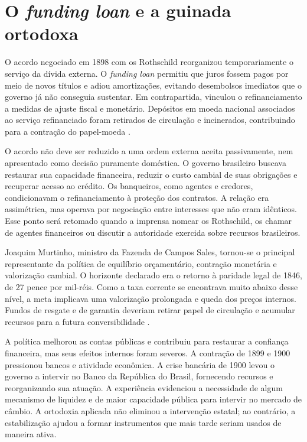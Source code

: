 \section{O \textit{funding loan} e a guinada ortodoxa}

O acordo negociado em 1898 com os Rothschild reorganizou temporariamente o serviço da dívida externa. O \textit{funding loan} permitiu que juros fossem pagos por meio de novos títulos e adiou amortizações, evitando desembolsos imediatos que o governo já não conseguia sustentar. Em contrapartida, vinculou o refinanciamento a medidas de ajuste fiscal e monetário. Depósitos em moeda nacional associados ao serviço refinanciado foram retirados de circulação e incinerados, contribuindo para a contração do papel-moeda \cite{fritsch1980,fritsch1990,francolago2011}.

O acordo não deve ser reduzido a uma ordem externa aceita passivamente, nem apresentado como decisão puramente doméstica. O governo brasileiro buscava restaurar sua capacidade financeira, reduzir o custo cambial de suas obrigações e recuperar acesso ao crédito. Os banqueiros, como agentes e credores, condicionavam o refinanciamento à proteção dos contratos. A relação era assimétrica, mas operava por negociação entre interesses que não eram idênticos. Esse ponto será retomado quando a imprensa nomear os Rothschild, os chamar de agentes financeiros ou discutir a autoridade exercida sobre recursos brasileiros.

Joaquim Murtinho, ministro da Fazenda de Campos Sales, tornou-se o principal representante da política de equilíbrio orçamentário, contração monetária e valorização cambial. O horizonte declarado era o retorno à paridade legal de 1846, de 27 pence por mil-réis. Como a taxa corrente se encontrava muito abaixo desse nível, a meta implicava uma valorização prolongada e queda dos preços internos. Fundos de resgate e de garantia deveriam retirar papel de circulação e acumular recursos para a futura conversibilidade \cite{neuhaus1975,fritsch1980}.

A política melhorou as contas públicas e contribuiu para restaurar a confiança financeira, mas seus efeitos internos foram severos. A contração de 1899 e 1900 pressionou bancos e atividade econômica. A crise bancária de 1900 levou o governo a intervir no Banco da República do Brasil, fornecendo recursos e reorganizando sua atuação. A experiência evidenciou a necessidade de algum mecanismo de liquidez e de maior capacidade pública para intervir no mercado de câmbio. A ortodoxia aplicada não eliminou a intervenção estatal; ao contrário, a estabilização ajudou a formar instrumentos que mais tarde seriam usados de maneira ativa.

